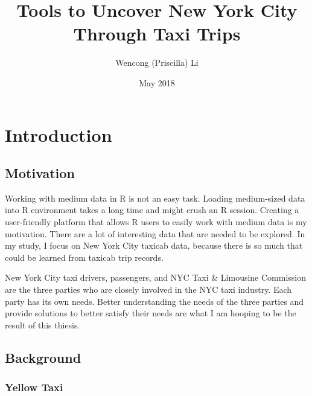 \documentclass[12pt,twoside]{reedthesis}
\title{Tools to Uncover New York City Through Taxi Trips}
\author{Wencong (Priscilla) Li}
\date{May 2018}
\theoremstyle{definition}
\theoremstyle{definition}
\theoremstyle{definition}
\theoremstyle{remark}
\begin{document}
  \maketitle

\frontmatter %
\pagestyle{empty} %



  \hypersetup{linkcolor=black}
  \setcounter{tocdepth}{2}
  \tableofcontents

  \listoftables

  \listoffigures



\mainmatter %
\pagestyle{fancyplain} %

\chapter{Introduction}\label{introduction}

\section{Motivation}\label{motivation}

Working with medium data in R is not an easy task. Loading medium-sized
data into R environment takes a long time and might crush an R session.
Creating a user-friendly platform that allows R users to easily work
with medium data is my motivation. There are a lot of interesting data
that are needed to be explored. In my study, I focus on New York City
taxicab data, because there is so much that could be learned from
taxicab trip records.

New York City taxi drivers, passengers, and NYC Taxi \& Limousine
Commission are the three parties who are closely involved in the NYC
taxi industry. Each party has its own needs. Better understanding the
needs of the three parties and provide solutions to better satisfy their
needs are what I am hooping to be the result of this thiesis.

\section{Background}\label{background}

\subsection{Yellow Taxi}\label{yellow-taxi}
\end{document}
